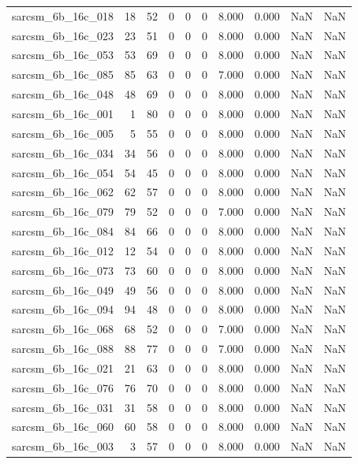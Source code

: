 \documentclass{article}
\begin{document}
\begin{longtable}{lrrrrrrrrr}
sarcsm\_6b\_16c\_018 & 18 & 52 & 0 & 0 & 0 & 8.000 & 0.000 & NaN & NaN \\
sarcsm\_6b\_16c\_023 & 23 & 51 & 0 & 0 & 0 & 8.000 & 0.000 & NaN & NaN \\
sarcsm\_6b\_16c\_053 & 53 & 69 & 0 & 0 & 0 & 8.000 & 0.000 & NaN & NaN \\
sarcsm\_6b\_16c\_085 & 85 & 63 & 0 & 0 & 0 & 7.000 & 0.000 & NaN & NaN \\
sarcsm\_6b\_16c\_048 & 48 & 69 & 0 & 0 & 0 & 8.000 & 0.000 & NaN & NaN \\
sarcsm\_6b\_16c\_001 & 1 & 80 & 0 & 0 & 0 & 8.000 & 0.000 & NaN & NaN \\
sarcsm\_6b\_16c\_005 & 5 & 55 & 0 & 0 & 0 & 8.000 & 0.000 & NaN & NaN \\
sarcsm\_6b\_16c\_034 & 34 & 56 & 0 & 0 & 0 & 8.000 & 0.000 & NaN & NaN \\
sarcsm\_6b\_16c\_054 & 54 & 45 & 0 & 0 & 0 & 8.000 & 0.000 & NaN & NaN \\
sarcsm\_6b\_16c\_062 & 62 & 57 & 0 & 0 & 0 & 8.000 & 0.000 & NaN & NaN \\
sarcsm\_6b\_16c\_079 & 79 & 52 & 0 & 0 & 0 & 7.000 & 0.000 & NaN & NaN \\
sarcsm\_6b\_16c\_084 & 84 & 66 & 0 & 0 & 0 & 8.000 & 0.000 & NaN & NaN \\
sarcsm\_6b\_16c\_012 & 12 & 54 & 0 & 0 & 0 & 8.000 & 0.000 & NaN & NaN \\
sarcsm\_6b\_16c\_073 & 73 & 60 & 0 & 0 & 0 & 8.000 & 0.000 & NaN & NaN \\
sarcsm\_6b\_16c\_049 & 49 & 56 & 0 & 0 & 0 & 8.000 & 0.000 & NaN & NaN \\
sarcsm\_6b\_16c\_094 & 94 & 48 & 0 & 0 & 0 & 8.000 & 0.000 & NaN & NaN \\
sarcsm\_6b\_16c\_068 & 68 & 52 & 0 & 0 & 0 & 7.000 & 0.000 & NaN & NaN \\
sarcsm\_6b\_16c\_088 & 88 & 77 & 0 & 0 & 0 & 7.000 & 0.000 & NaN & NaN \\
sarcsm\_6b\_16c\_021 & 21 & 63 & 0 & 0 & 0 & 8.000 & 0.000 & NaN & NaN \\
sarcsm\_6b\_16c\_076 & 76 & 70 & 0 & 0 & 0 & 8.000 & 0.000 & NaN & NaN \\
sarcsm\_6b\_16c\_031 & 31 & 58 & 0 & 0 & 0 & 8.000 & 0.000 & NaN & NaN \\
sarcsm\_6b\_16c\_060 & 60 & 58 & 0 & 0 & 0 & 8.000 & 0.000 & NaN & NaN \\
sarcsm\_6b\_16c\_003 & 3 & 57 & 0 & 0 & 0 & 8.000 & 0.000 & NaN & NaN \\

\end{longtable}
\end{document}
